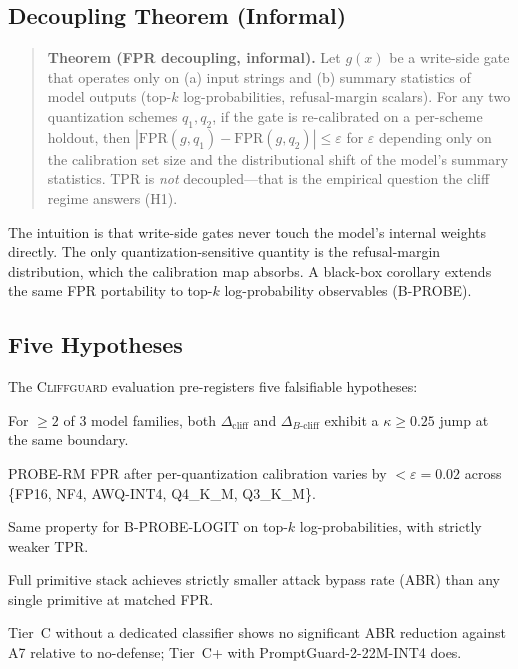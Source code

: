 \documentclass[11pt,a4paper]{article}
\newcommand{\cliff}{\Delta_{\mathrm{cliff}}}
\newcommand{\bcliff}{\Delta_{B\text{-cliff}}}
\newcommand{\kap}{\kappa}
\newcommand{\CG}{\textsc{Cliffguard}}
\begin{document}
\subsection{Decoupling Theorem (Informal)}
\label{sec:decoupling}

\begin{quote}
\textbf{Theorem (FPR decoupling, informal).} Let $g(x)$ be a write-side gate
that operates only on (a) input strings and (b) summary statistics of model
outputs (top-$k$ log-probabilities, refusal-margin scalars).
For any two quantization schemes $q_1, q_2$, if the gate is re-calibrated on a
per-scheme holdout, then
$|\mathrm{FPR}(g, q_1) - \mathrm{FPR}(g, q_2)| \le \varepsilon$
for $\varepsilon$ depending only on the calibration set size and the
distributional shift of the model's summary statistics.
TPR is \emph{not} decoupled---that is the empirical question the cliff regime
answers (H1).
\end{quote}

The intuition is that write-side gates never touch the model's internal weights
directly.
The only quantization-sensitive quantity is the refusal-margin distribution,
which the calibration map absorbs.
A black-box corollary extends the same FPR portability to top-$k$
log-probability observables (B-PROBE).

\subsection{Five Hypotheses}
\label{sec:hypotheses}

The \CG{} evaluation pre-registers five falsifiable hypotheses:

\begin{description}[leftmargin=1.5em, itemsep=3pt]
  \item[H1 (cliff existence).] For $\ge 2$ of 3 model families, both $\cliff$
        and $\bcliff$ exhibit a $\kap \ge 0.25$ jump at the same boundary.
  \item[H2 (FPR decoupling, white-box).] PROBE-RM FPR after per-quantization
        calibration varies by $< \varepsilon = 0.02$ across
        \{FP16, NF4, AWQ-INT4, Q4\_K\_M, Q3\_K\_M\}.
  \item[H3 (FPR decoupling, black-box).] Same property for B-PROBE-LOGIT on
        top-$k$ log-probabilities, with strictly weaker TPR.
  \item[H4 (composition gain).] Full primitive stack achieves strictly smaller
        attack bypass rate (ABR) than any single primitive at matched FPR.
  \item[H5 (Tier-C structural weakness).] Tier~C without a dedicated classifier
        shows no significant ABR reduction against A7 relative to no-defense;
        Tier~C+ with PromptGuard-2-22M-INT4 does.
\end{description}
\end{document}
